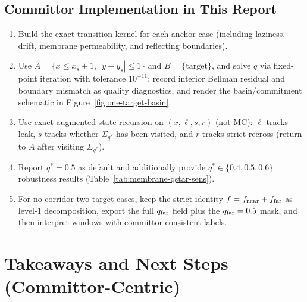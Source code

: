 \documentclass[11pt]{article}
\begin{document}
\subsection*{Committor Implementation in This Report}
\begin{enumerate}
  \item Build the exact transition kernel for each anchor case (including laziness, drift, membrane permeability, and reflecting boundaries).
  \item Use $A=\{x\le x_s+1,\ |y-y_s|\le 1\}$ and $B=\{\text{target}\}$, and solve $q$ via fixed-point iteration with tolerance $10^{-11}$; record interior Bellman residual and boundary mismatch as quality diagnostics, and render the basin/commitment schematic in Figure~\ref{fig:one-target-basin}.
  \item Use exact augmented-state recursion on $(x,\ell,s,r)$ (not MC): $\ell$ tracks leak, $s$ tracks whether $\Sigma_{q^*}$ has been visited, and $r$ tracks strict recross (return to $A$ after visiting $\Sigma_{q^*}$).
  \item Report $q^*=0.5$ as default and additionally provide $q^*\in\{0.4,0.5,0.6\}$ robustness results (Table~\ref{tab:membrane-qstar-sens}).
  \item For no-corridor two-target cases, keep the strict identity $f=f_{\rm near}+f_{\rm far}$ as level-1 decomposition, export the full $q_{\rm far}$ field plus the $q_{\rm far}=0.5$ mask, and then interpret windows with committor-consistent labels.
\end{enumerate}

\section{Takeaways and Next Steps (Committor-Centric)}
\end{document}
